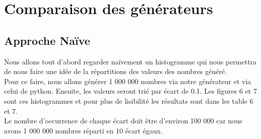 \documentclass[french]{article}
\begin{document}
\section{Comparaison des générateurs}
\subsection{Approche Naïve}
Nous allons tout d'abord regarder naïvement un histogramme qui nous permettra de nous faire une idée de la répartitions des valeurs des nombres généré.
\\
Pour ce faire, nous allons générer 1 000 000 nombres via notre générateur et via celui de python. Ensuite, les valeurs seront trié par écart de 0.1. Les figures 6 et 7 sont ces histogrammes et pour plus de lisibilité les résultats sont dans les table 6 et 7.
\\
Le nombre d'occurrence de chaque écart doit être d'environ 100 000 car nous avons 1 000 000 nombres réparti en 10 écart égaux.
\end{document}
